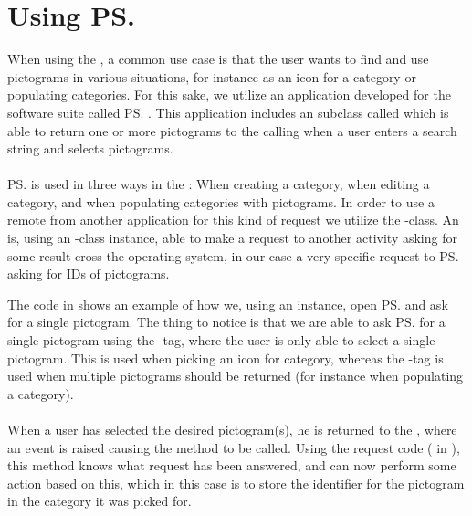 
\section{Using \ps}
\label{sec:using_pictosearch}

When using the \ct, a common use case is that the user wants to find and use pictograms in various situations, for instance as an icon for a category or populating categories. For this sake, we utilize an application developed for the \giraf software suite called \ps. This application includes an  subclass called  which is able to return one or more pictograms to the calling  when a user enters a search string and selects pictograms. 
\\\\
\ps is used in three ways in the \ct: When creating a category, when editing a category, and when populating categories with pictograms. In order to use a remote  from another application for this kind of request we utilize the -class. An  is, using an -class instance, able to make a request to another activity asking for some result cross the operating system, in our case a very specific request to \ps asking for IDs of pictograms. 



The code in  shows an example of how we, using an  instance, open \ps and ask for a single pictogram. The thing to notice is that we are able to ask \ps for a single pictogram using the -tag, where the user is only able to select a single pictogram. This is used when picking an icon for category, whereas the -tag is used when multiple pictograms should be returned (for instance when populating a category). 
\\\\
When a user has selected the desired pictogram(s), he is returned to the \ct, where an event is raised causing the method  to be called. Using the request code ( in ), this method knows what request has been answered, and can now perform some action based on this, which in this case is to store the identifier for the pictogram in the category it was picked for.

